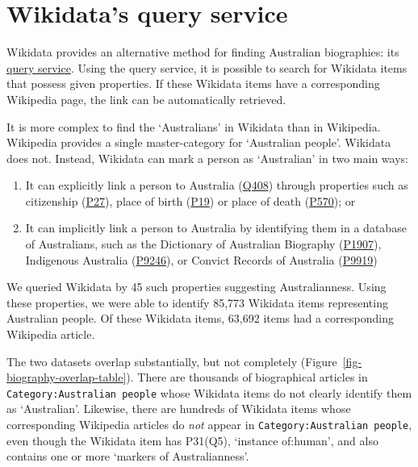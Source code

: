 \documentclass[
  a4paper,
  DIV=11,
  numbers=noendperiod]{scrreprt}
\providecommand{\tightlist}{%
  \setlength{\itemsep}{0pt}\setlength{\parskip}{0pt}}\usepackage{longtable,booktabs,array}
\begin{document}
\hypertarget{wikidatas-query-service}{%
\section{Wikidata's query service}\label{wikidatas-query-service}}

Wikidata provides an alternative method for finding Australian
biographies: its \href{https://query.wikidata.org/}{query service}.
Using the query service, it is possible to search for Wikidata items
that possess given properties. If these Wikidata items have a
corresponding Wikipedia page, the link can be automatically retrieved.

It is more complex to find the `Australians' in Wikidata than in
Wikipedia. Wikipedia provides a single master-category for `Australian
people'. Wikidata does not. Instead, Wikidata can mark a person as
`Australian' in two main ways:

\begin{enumerate}
\def\labelenumi{\arabic{enumi}.}
\tightlist
\item
  It can explicitly link a person to Australia
  (\href{https://www.wikidata.org/wiki/Q408}{Q408}) through properties
  such as citizenship
  (\href{https://www.wikidata.org/wiki/Property:P27}{P27}), place of
  birth (\href{https://www.wikidata.org/wiki/Property:P19}{P19}) or
  place of death
  (\href{https://www.wikidata.org/wiki/Property:P570}{P570}); or
\item
  It can implicitly link a person to Australia by identifying them in a
  database of Australians, such as the Dictionary of Australian
  Biography
  (\href{https://www.wikidata.org/wiki/Property:P1907}{P1907}),
  Indigenous Australia
  (\href{https://www.wikidata.org/wiki/Property:P9246}{P9246}), or
  Convict Records of Australia
  (\href{https://www.wikidata.org/wiki/Property:P9919}{P9919})
\end{enumerate}

We queried Wikidata by 45 such properties suggesting Australianness.
Using these properties, we were able to identify 85,773 Wikidata items
representing Australian people. Of these Wikidata items, 63,692 items
had a corresponding Wikipedia article.

The two datasets overlap substantially, but not completely
(Figure~\ref{fig-biography-overlap-table}). There are thousands of
biographical articles in \texttt{Category:Australian\ people} whose
Wikidata items do not clearly identify them as `Australian'. Likewise,
there are hundreds of Wikidata items whose corresponding Wikipedia
articles do \emph{not} appear in \texttt{Category:Australian\ people},
even though the Wikidata item has P31(Q5), `instance of:human', and also
contains one or more `markers of Australianness'.
\end{document}
